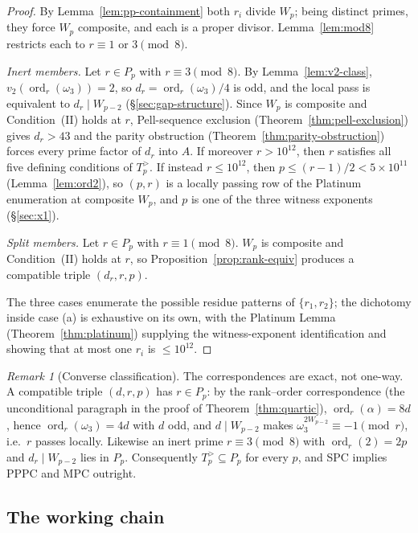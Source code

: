 \documentclass[11pt]{amsart}
\theoremstyle{plain}
\theoremstyle{definition}
\theoremstyle{remark}
\newtheorem{remark}[theorem]{Remark}
\numberwithin{equation}{section}
\newcommand{\ord}{\operatorname{ord}}
\begin{document}
\begin{proof}
By Lemma~\ref{lem:pp-containment} both $r_i$ divide $W_p$; being
distinct primes, they force $W_p$ composite, and each is a proper
divisor. Lemma~\ref{lem:mod8} restricts each to $r \equiv 1$ or
$3 \pmod 8$.

\emph{Inert members.} Let $r \in P_p$ with $r \equiv 3 \pmod 8$. By
Lemma~\ref{lem:v2-class}, $v_2(\ord_r(\omega_3)) = 2$, so
$d_r = \ord_r(\omega_3)/4$ is odd, and the local pass is equivalent to
$d_r \mid W_{p-2}$ (\S\ref{sec:gap-structure}). Since $W_p$ is composite
and Condition~(II) holds at $r$, Pell-sequence exclusion
(Theorem~\ref{thm:pell-exclusion}) gives $d_r > 43$ and the parity
obstruction (Theorem~\ref{thm:parity-obstruction}) forces every prime
factor of $d_r$ into $A$. If moreover $r > 10^{12}$, then $r$ satisfies
all five defining conditions of $T_p^{>}$. If instead $r \leq 10^{12}$,
then $p \leq (r-1)/2 < 5 \times 10^{11}$ (Lemma~\ref{lem:ord2}), so
$(p, r)$ is a locally passing row of the Platinum enumeration at
composite $W_p$, and $p$ is one of the three witness exponents
(\S\ref{sec:x1}).

\emph{Split members.} Let $r \in P_p$ with $r \equiv 1 \pmod 8$. $W_p$
is composite and Condition~(II) holds at $r$, so
Proposition~\ref{prop:rank-equiv} produces a compatible triple
$(d_r, r, p)$.

The three cases enumerate the possible residue patterns of
$\{r_1, r_2\}$; the dichotomy inside case (a) is exhaustive on its own,
with the Platinum Lemma (Theorem~\ref{thm:platinum}) supplying the
witness-exponent identification and showing that at most one $r_i$ is
$\leq 10^{12}$.
\end{proof}

\begin{remark}[Converse classification]\label{rem:branch-converse}
The correspondences are exact, not one-way. A compatible triple
$(d, r, p)$ has $r \in P_p$: by the rank--order correspondence
(the unconditional paragraph in the proof of Theorem~\ref{thm:quartic}),
$\ord_r(\alpha) = 8d$, hence $\ord_r(\omega_3) = 4d$ with $d$ odd, and
$d \mid W_{p-2}$ makes $\omega_3^{2 W_{p-2}} \equiv -1 \pmod r$, i.e.\
$r$ passes locally. Likewise an inert prime $r \equiv 3 \pmod 8$ with
$\ord_r(2) = 2p$ and $d_r \mid W_{p-2}$ lies in $P_p$. Consequently
$T_p^{>} \subseteq P_p$ for every $p$, and SPC implies PPPC and MPC
outright.
\end{remark}

\subsection{The working chain}
\end{document}
